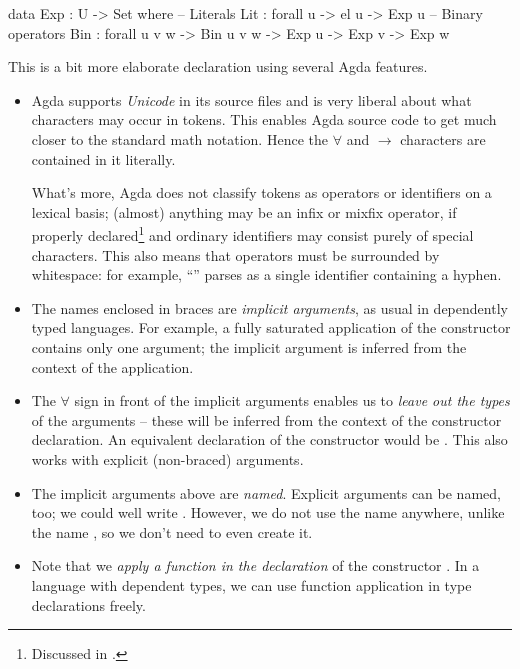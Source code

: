 \begin{code}
  data Exp : U -> Set where
    -- Literals
    Lit : forall {u} -> el u -> Exp u
    -- Binary operators
    Bin : forall {u v w} -> Bin u v w -> Exp u -> Exp v -> Exp w
\end{code}\label{sec:simple-exp}

\noindent This is a bit more elaborate declaration using several Agda features.
\begin{itemize}
	\item Agda supports \emph{Unicode} in its source files and is very liberal about what
		characters may occur in tokens. This enables Agda source code to get much closer
		to the standard math notation. Hence the $\forall$ and $\to$ characters
		are contained in it literally.
		
		What's more, Agda does not classify tokens as operators or identifiers
		on a lexical basis; (almost) anything may be an infix or mixfix operator,
		if properly declared\footnote{Discussed in .} and ordinary
		identifiers may consist purely of special characters.
		This also means that operators must be surrounded by whitespace: for example,
		``'' parses as a single identifier containing a hyphen.
		
	\item The names enclosed in braces are \emph{implicit arguments}, as usual
		in dependently typed languages. For example, a fully saturated application of the
		constructor  contains only one argument; the implicit argument
		 is inferred from the context of the application.
		
	\item The $\forall$ sign in front of the implicit arguments enables us to \emph{leave
		out the types} of the arguments -- these will be inferred from the context of
		the constructor declaration. An equivalent declaration of the constructor 
		would be .
		This also works with explicit (non-braced) arguments.

	\item The implicit arguments above are \emph{named}. Explicit arguments can be named, too;
		we could well write .
		However, we do not use the name  anywhere, unlike the name ,
		so we don't need to even create it.
		
	\item Note that we \emph{apply a function in the declaration} of the constructor
		. In a language with dependent types, we can use function application
		in type declarations freely.
\end{itemize}

